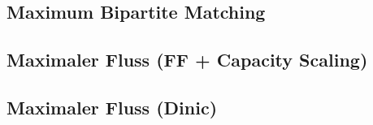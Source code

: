 %


%



%


%

%

\subsection{Maximum Bipartite Matching}


\subsection{Maximaler Fluss (FF + Capacity Scaling)}


\subsection{Maximaler Fluss (Dinic)}


